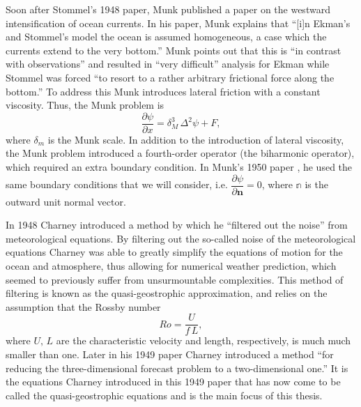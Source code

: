 Soon after Stommel's 1948 paper, Munk \cite{Munk1950} published a paper on the
westward intensification of ocean currents. In his paper, Munk explains that
``[i]n Ekman's and Stommel's model the ocean is assumed homogeneous, a case
which the currents extend to the very bottom.'' Munk points out that this is
``in contrast with observations'' and resulted in ``very difficult'' analysis
for Ekman while Stommel was forced ``to resort to a rather arbitrary frictional
force along the bottom.'' To address this Munk introduces lateral friction with
a constant viscosity. Thus, the Munk problem is
\cite{Fox-Kemper2003,Munk1950,Vallis06}
\begin{equation}
  \frac{\partial \psi}{\partial x} = \delta_M^3\, \Delta^2 \psi + F,
  \label{eqn:MunkProblem}
\end{equation}
where $\delta_m$ is the Munk scale. In addition to the introduction of lateral
viscosity, the Munk problem introduced a fourth-order operator (the biharmonic
operator), which required an extra boundary condition.  In Munk's 1950
paper \cite{Munk1950}, he used the same boundary conditions that we will
consider, i.e. $\dfrac{\partial \psi}{\partial \mathbf{n}} = 0$, where
$\mathbb{n}$ is the outward unit normal vector.

In 1948 Charney \cite{Charney1948} introduced a method by which he ``filtered out
the noise'' from meteorological equations. By filtering out the so-called noise
of the meteorological equations Charney was able to greatly simplify the
equations of motion for the ocean and atmosphere, thus allowing for numerical
weather prediction, which seemed to previously suffer from unsurmountable
complexities. This method of filtering is known as the quasi-geostrophic
approximation, and relies on the assumption that the Rossby number
\begin{equation}
  Ro = \frac{U}{f\, L},
  \label{eqn:RossbyNumber}
\end{equation}
where $U,\, L$ are the characteristic velocity and length, respectively, is
much much smaller than one. Later in his 1949 paper \cite{Charney1949} Charney
introduced a method ``for reducing the three-dimensional forecast problem to a
two-dimensional one.'' It is the equations Charney introduced in this 1949 paper
that has now come to be called the quasi-geostrophic equations and is the main
focus of this thesis.
